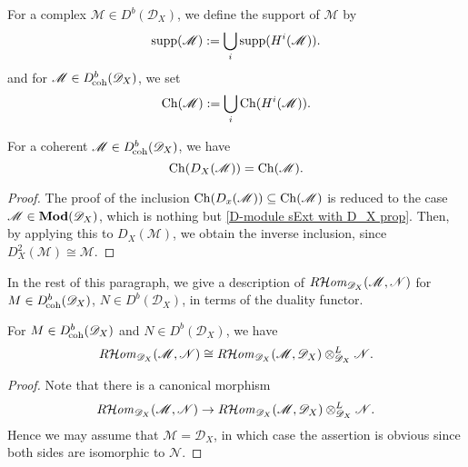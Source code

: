 For a complex $\mathscr{M}\in D^b(\mathscr{D}_X)$, we define the support of $\mathscr{M}$ by
\[\mathrm{supp}(\mathscr{M}):=\bigcup_i\mathrm{supp}(H^i(\mathscr{M})).\]
and for $\mathscr{M}\in D^b_{\!\mathrm{coh}}(\mathscr{D}_X)$, we set
\[\mathrm{Ch}(\mathscr{M}):=\bigcup_i\mathrm{Ch}(H^i(\mathscr{M})).\]
\begin{proposition}\label{D-module dual of coh characteristic variety char}
For a coherent $\mathscr{M}\in D_{\!\mathrm{coh}}^b(\mathscr{D}_X)$, we have
\[\mathrm{Ch}(D_X(\mathscr{M}))=\mathrm{Ch}(\mathscr{M}).\]
\end{proposition}
\begin{proof}
The proof of the inclusion $\mathrm{Ch}(D_x(\mathscr{M}))\subseteq\mathrm{Ch}(\mathscr{M})$ is reduced to the case $\mathscr{M}\in\mathbf{Mod}(\mathscr{D}_X)$, which is nothing but \cref{D-module sExt with D_X prop}. Then, by applying this to $D_X(\mathscr{M})$, we obtain the inverse inclusion, since $D_X^2(\mathscr{M})\cong\mathscr{M}$.
\end{proof}

In the rest of this paragraph, we give a description of $R\!\operatorname{\mathcal{H}\hspace*{-0.4pt}\textit{om}\hspace{0.5pt}}_{\mathscr{D}_X}(\mathscr{M},\mathscr{N})$ for $M\in D^b_{\!\mathrm{coh}}(\mathscr{D}_X)$, $N\in D^b(\mathscr{D}_X)$, in terms of the duality functor.

\begin{lemma}\label{D-module Hom and tensor with dual isomorphic for coh}
For $M\in D^b_{\!\mathrm{coh}}(\mathscr{D}_X)$ and $N\in D^b(\mathscr{D}_X)$, we have
\[R\!\operatorname{\mathcal{H}\hspace*{-0.4pt}\textit{om}\hspace{0.5pt}}_{\mathscr{D}_X}(\mathscr{M},\mathscr{N})\cong R\!\operatorname{\mathcal{H}\hspace*{-0.4pt}\textit{om}\hspace{0.5pt}}_{\mathscr{D}_X}(\mathscr{M},\mathscr{D}_X)\otimes_{\mathscr{D}_X}^L\mathscr{N}.\]
\end{lemma}
\begin{proof}
Note that there is a canonical morphism
\[R\!\operatorname{\mathcal{H}\hspace*{-0.4pt}\textit{om}\hspace{0.5pt}}_{\mathscr{D}_X}(\mathscr{M},\mathscr{N})\to  R\!\operatorname{\mathcal{H}\hspace*{-0.4pt}\textit{om}\hspace{0.5pt}}_{\mathscr{D}_X}(\mathscr{M},\mathscr{D}_X)\otimes_{\mathscr{D}_X}^L\mathscr{N}.\]
Hence we may assume that $\mathscr{M}=\mathscr{D}_X$, in which case the assertion is obvious since both sides are isomorphic to $\mathscr{N}$.
\end{proof}

